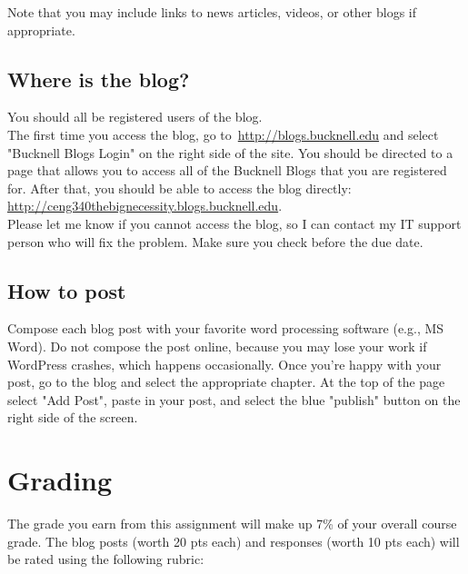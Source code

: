 \documentclass[12pt,letterpaper]{article}
\begin{document}
Note that you may include links to news articles, videos, or other blogs if appropriate.

\subsection *{Where is the blog?}
You should all be registered users of the blog.\\

 The first time you access the blog, go to\
 \href{http://blogs.bucknell.edu}{http://blogs.bucknell.edu} and select "Bucknell Blogs Login" on the right side of the site.  You should be directed to a page that allows you to access all of the  Bucknell Blogs that you are registered for. After that, you should be able to access the blog directly:
\href{http://ceng340thebignecessity.blogs.bucknell.edu}{http://ceng340thebignecessity.blogs.bucknell.edu}.\\

Please let me know if you cannot access the blog, so I can contact my IT support person who will fix the problem. Make sure you check before the due date.

\subsection *{How to post}
Compose each blog post with your favorite word processing software (e.g., MS Word).  Do not compose the post online, because you may lose your work if WordPress crashes, which happens occasionally. Once you're happy with your post, go to the blog and select the appropriate chapter.  At the top of the page select "Add Post", paste in your post, and select the blue "publish" button on the right side of the screen.


\pagebreak

\section *{Grading}
The grade you earn from this assignment will make up 7\% of your overall course grade.  The blog posts (worth 20 pts each) and responses (worth 10 pts each) will be rated using the following rubric:\\\\
\end{document}
